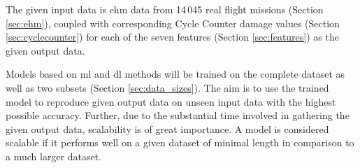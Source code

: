 The given input data is \ac{ehm} data from 14\,045 real flight missions (Section \ref{sec:ehm}), coupled with corresponding Cycle Counter damage values (Section \ref{sec:cyclecounter}) for each of the seven features (Section \ref{sec:features}) as the given output data.

Models based on \ac{ml} and \ac{dl} methods will be trained on the complete dataset as well as two subsets (Section \ref{sec:data_sizes}). The aim is to use the trained model to reproduce given output data on unseen input data with the highest possible accuracy. Further, due to the substantial time involved in gathering the given output data, scalability is of great importance. A model is considered scalable if it performs well on a given dataset of minimal length in comparison to a much larger dataset.